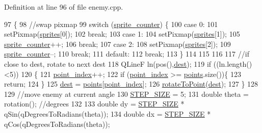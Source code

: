 Definition at line 96 of file enemy.\+cpp.


\begin{DoxyCode}
97 \{
98     \textcolor{comment}{//swap pixmap}
99     \textcolor{keywordflow}{switch} (\hyperlink{class_enemy_ad36955113c7ac1218b7435d7a87cb846}{sprite\_counter}) \{
100     \textcolor{keywordflow}{case} 0:
101         setPixmap(\hyperlink{class_enemy_ae65aa5ab482bb5eae5c0329c821e5827}{sprites}[0]);
102         \textcolor{keywordflow}{break};
103     \textcolor{keywordflow}{case} 1:
104         setPixmap(\hyperlink{class_enemy_ae65aa5ab482bb5eae5c0329c821e5827}{sprites}[1]);
105         \hyperlink{class_enemy_ad36955113c7ac1218b7435d7a87cb846}{sprite\_counter}++;
106         \textcolor{keywordflow}{break};
107     \textcolor{keywordflow}{case} 2:
108         setPixmap(\hyperlink{class_enemy_ae65aa5ab482bb5eae5c0329c821e5827}{sprites}[2]);
109         \hyperlink{class_enemy_ad36955113c7ac1218b7435d7a87cb846}{sprite\_counter}--;
110         \textcolor{keywordflow}{break};
111     \textcolor{keywordflow}{default}:
112         \textcolor{keywordflow}{break};
113     \}
114 
115 
116 
117     \textcolor{comment}{//if close to dest, rotate to next dest}
118     QLineF ln(pos(),\hyperlink{class_enemy_a50c844f66858b84fc8ebdfccf7e2c535}{dest});
119     \textcolor{keywordflow}{if} ((ln.length() <5))
120     \{
121         \hyperlink{class_enemy_a7291ad5563a976b78fbf6731b353f1c9}{point\_index}++;
122         \textcolor{keywordflow}{if} (\hyperlink{class_enemy_a7291ad5563a976b78fbf6731b353f1c9}{point\_index} >= \hyperlink{class_enemy_ae8af9f207c5285b56f7cb190c66994c8}{points}.size())\{
123             \textcolor{keywordflow}{return};
124         \}
125         \hyperlink{class_enemy_a50c844f66858b84fc8ebdfccf7e2c535}{dest} = \hyperlink{class_enemy_ae8af9f207c5285b56f7cb190c66994c8}{points}[\hyperlink{class_enemy_a7291ad5563a976b78fbf6731b353f1c9}{point\_index}];
126         \hyperlink{class_enemy_aed33c099d6ec54e1c6cfb676ac38de5b}{rotateToPoint}(\hyperlink{class_enemy_a50c844f66858b84fc8ebdfccf7e2c535}{dest});
127     \}
128 
129     \textcolor{comment}{//move enemy at current angle}
130     \hyperlink{class_enemy_aa949fdeff0f2f52bc9e779e69dfc27e0}{STEP\_SIZE} = 5;
131     \textcolor{keywordtype}{double} theta = rotation(); \textcolor{comment}{//degrees}
132 
133     \textcolor{keywordtype}{double} dy = \hyperlink{class_enemy_aa949fdeff0f2f52bc9e779e69dfc27e0}{STEP\_SIZE} * qSin(qDegreesToRadians(theta));
134     \textcolor{keywordtype}{double} dx = \hyperlink{class_enemy_aa949fdeff0f2f52bc9e779e69dfc27e0}{STEP\_SIZE} * qCos(qDegreesToRadians(theta));

\end{DoxyCode}
